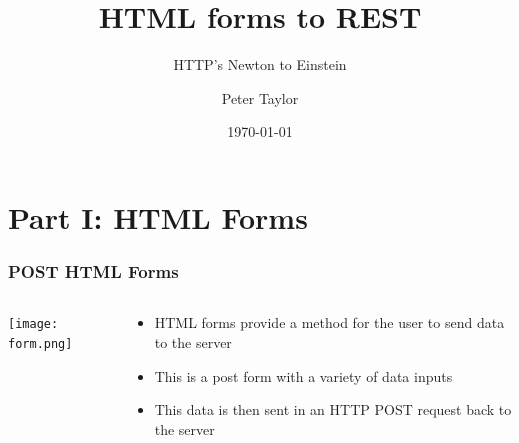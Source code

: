 \documentclass[aspectratio=169]{beamer}
\title{HTML forms to REST}
\subtitle{HTTP's Newton to Einstein}
\author{Peter Taylor}
\date{\today}
\begin{document}
{
\begin{frame}[plain]
\end{frame}
}

\maketitleslide

\section{Part I: HTML Forms}

\begin{frame}
  \frametitle{POST HTML Forms}
  \begin{columns}
    \begin{column}{0.6\textwidth}
      \texttt{[image: form.png]}\\    
    \end{column}
  
    \begin{column}{0.35\textwidth}
      \begin{itemize}
        \item HTML forms provide a method for the user to send data to the server
        \item This is a post form with a variety of data inputs
        \item This data is then sent in an HTTP POST request back to the server
      \end{itemize}
    \end{column}
  \end{columns}
\end{frame}
\end{document}
